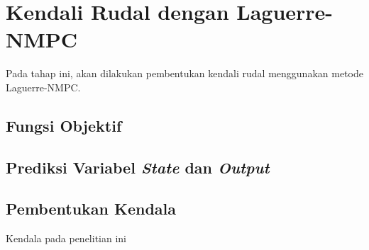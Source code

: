 \section{Kendali Rudal dengan Laguerre-NMPC}
Pada tahap ini, akan dilakukan pembentukan kendali rudal menggunakan metode Laguerre-NMPC.

\subsection{Fungsi Objektif}

\subsection{Prediksi Variabel \textit{State} dan \textit{Output}}

\subsection{Pembentukan Kendala}
Kendala pada penelitian ini
